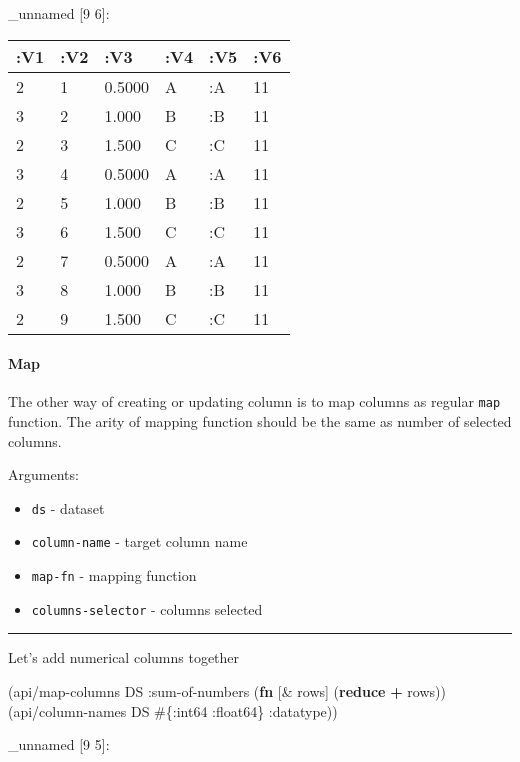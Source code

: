 \documentclass[]{article}
\newenvironment{Shaded}{\begin{snugshade}}{\end{snugshade}}
\newcommand{\KeywordTok}[1]{\textcolor[rgb]{0.13,0.29,0.53}{\textbf{#1}}}
\newcommand{\AttributeTok}[1]{\textcolor[rgb]{0.77,0.63,0.00}{#1}}
\newcommand{\NormalTok}[1]{#1}
\providecommand{\tightlist}{%
  \setlength{\itemsep}{0pt}\setlength{\parskip}{0pt}}
\let\oldparagraph\paragraph
\renewcommand{\paragraph}[1]{\oldparagraph{#1}\mbox{}}
\begin{document}
\_unnamed {[}9 6{]}:

\begin{longtable}[]{@{}llllll@{}}
\toprule
:V1 & :V2 & :V3 & :V4 & :V5 & :V6\tabularnewline
\midrule
\endhead
2 & 1 & 0.5000 & A & :A & 11\tabularnewline
3 & 2 & 1.000 & B & :B & 11\tabularnewline
2 & 3 & 1.500 & C & :C & 11\tabularnewline
3 & 4 & 0.5000 & A & :A & 11\tabularnewline
2 & 5 & 1.000 & B & :B & 11\tabularnewline
3 & 6 & 1.500 & C & :C & 11\tabularnewline
2 & 7 & 0.5000 & A & :A & 11\tabularnewline
3 & 8 & 1.000 & B & :B & 11\tabularnewline
2 & 9 & 1.500 & C & :C & 11\tabularnewline
\bottomrule
\end{longtable}

\paragraph{Map}\label{map}

The other way of creating or updating column is to map columns as
regular \texttt{map} function. The arity of mapping function should be
the same as number of selected columns.

Arguments:

\begin{itemize}
\tightlist
\item
  \texttt{ds} - dataset
\item
  \texttt{column-name} - target column name
\item
  \texttt{map-fn} - mapping function
\item
  \texttt{columns-selector} - columns selected
\end{itemize}

\begin{center}\rule{0.5\linewidth}{0.5pt}\end{center}

Let's add numerical columns together

\begin{Shaded}
\begin{Highlighting}[]
\NormalTok{(api/map-columns DS }\AttributeTok{:sum-of-numbers}\NormalTok{ (}\KeywordTok{fn}\NormalTok{ [& rows]}
\NormalTok{                                      (}\KeywordTok{reduce} \KeywordTok{+}\NormalTok{ rows)) (api/column-names DS  #\{}\AttributeTok{:int64} \AttributeTok{:float64}\NormalTok{\} }\AttributeTok{:datatype}\NormalTok{))}
\end{Highlighting}
\end{Shaded}

\_unnamed {[}9 5{]}:
\end{document}
